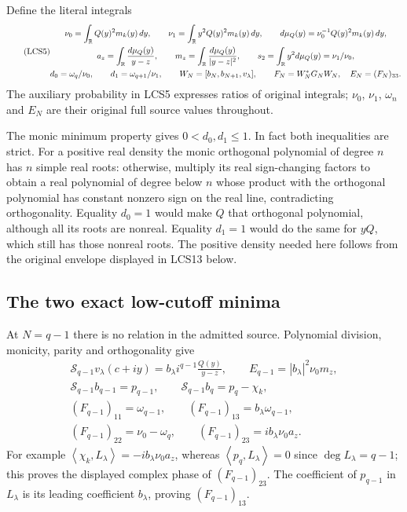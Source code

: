 \documentclass[11pt]{article}
\newcommand{\ip}[2]{\left\langle#1,#2\right\rangle}
\begin{document}
Define the literal integrals
\begin{equation}\tag{LCS5}
\begin{gathered}
 \nu_0=\int_\mathbb R Q(y)^2m_k(y)\,dy,\qquad
 \nu_1=\int_\mathbb R y^2Q(y)^2m_k(y)\,dy,\qquad
 d\mu_Q(y)=\nu_0^{-1}Q(y)^2m_k(y)\,dy,\\
 a_z=\int_\mathbb R\frac{d\mu_Q(y)}{y-z},\qquad
 m_z=\int_\mathbb R\frac{d\mu_Q(y)}{|y-z|^2},\qquad
 s_2=\int_\mathbb R y^2d\mu_Q(y)=\nu_1/\nu_0,\\
 d_0=\omega_q/\nu_0,\qquad d_1=\omega_{q+1}/\nu_1,\qquad
 W_N=[b_N,b_{N+1},v_\lambda],\qquad
 F_N=W_N^*G_NW_N,\quad E_N=(F_N)_{33}.
\end{gathered}
\end{equation}
The auxiliary probability in LCS5 expresses ratios of original
integrals; $\nu_0$, $\nu_1$, $\omega_n$ and $E_N$ are their original
full source values throughout.

The monic minimum property gives $0<d_0,d_1\le1$. In fact both
inequalities are strict. For a positive real density the monic
orthogonal polynomial of degree $n$ has $n$ simple real roots:
otherwise, multiply its real sign-changing factors to obtain a
real polynomial of degree below $n$ whose product with the
orthogonal polynomial has constant nonzero sign on the real line,
contradicting orthogonality. Equality $d_0=1$ would make $Q$ that
orthogonal polynomial, although all its roots are nonreal.
Equality $d_1=1$ would do the same for $yQ$, which still has those
nonreal roots. The positive density needed here follows from the
original envelope displayed in LCS13 below.

\subsection{The two exact low-cutoff minima}

At $N=q-1$ there is no relation in the admitted source. Polynomial
division, monicity, parity and orthogonality give
\begin{equation}\tag{LCS6}
\begin{gathered}
 \mathscr S_{q-1}v_\lambda(c+iy)
        =b_\lambda i^{q-1}\frac{Q(y)}{y-z},\qquad
 E_{q-1}=|b_\lambda|^2\nu_0m_z,\\
 \mathscr S_{q-1}b_{q-1}=p_{q-1},\qquad
 \mathscr S_{q-1}b_q=p_q-\chi_k,\\
 (F_{q-1})_{11}=\omega_{q-1},\qquad
 (F_{q-1})_{13}=b_\lambda\omega_{q-1},\\
 (F_{q-1})_{22}=\nu_0-\omega_q,\qquad
 (F_{q-1})_{23}=i b_\lambda\nu_0a_z.
\end{gathered}
\end{equation}
For example $\ip{\chi_k}{L_\lambda}=-i b_\lambda\nu_0a_z$,
whereas $\ip{p_q}{L_\lambda}=0$ since $\deg L_\lambda=q-1$;
this proves the displayed complex phase of $(F_{q-1})_{23}$.
The coefficient of $p_{q-1}$ in $L_\lambda$ is its leading
coefficient $b_\lambda$, proving $(F_{q-1})_{13}$.
\end{document}
